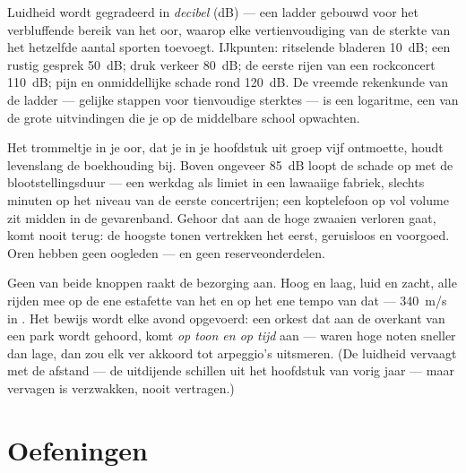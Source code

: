 \begin{example}[De decibelladder]\label{ex:g8:sound-pitch-loudness:decibels}
Luidheid wordt gegradeerd in \emph{decibel} (\unit{dB})
--- een ladder gebouwd voor het verbluffende bereik van het oor, waarop
elke vertienvoudiging van de sterkte van het  hetzelfde
aantal sporten toevoegt. IJkpunten: ritselende bladeren \qty{10}{dB};
een rustig gesprek \qty{50}{dB}; druk verkeer \qty{80}{dB}; de eerste
rijen van een rockconcert \qty{110}{dB}; pijn en onmiddellijke schade
rond \qty{120}{dB}. De vreemde rekenkunde van de ladder --- gelijke
stappen voor tienvoudige sterktes --- is een logaritme, een van de
grote uitvindingen die je op de middelbare school opwachten.
\end{example}

\begin{remark}\label{rem:g8:sound-pitch-loudness:earsafety}
Het trommeltje in je oor, dat je in je hoofdstuk uit groep vijf
ontmoette, houdt levenslang de boekhouding bij. Boven ongeveer
\qty{85}{dB} loopt de schade op met de blootstellingsduur --- een
werkdag als limiet in een lawaaiige fabriek, slechts minuten op het
niveau van de eerste concertrijen; een koptelefoon op vol volume zit
midden in de gevarenband. Gehoor dat aan de hoge zwaaien verloren
gaat, komt nooit terug: de hoogste tonen vertrekken het eerst, geruisloos
en voorgoed. Oren hebben geen oogleden --- en geen reserveonderdelen.
\end{remark}

\begin{example}\label{ex:g8:sound-pitch-loudness:speed}
Geen van beide knoppen raakt de bezorging aan. Hoog en laag, luid en
zacht, alle  rijden mee op de ene estafette van het
 en op het ene tempo van dat  ---
\qty{340}{m/s} in . Het bewijs wordt elke avond opgevoerd:
een orkest dat aan de overkant van een park wordt gehoord, komt
\emph{op toon en op tijd} aan --- waren hoge noten sneller dan lage, dan
zou elk ver akkoord tot arpeggio's uitsmeren. (De luidheid vervaagt met
de afstand --- de uitdijende schillen uit het hoofdstuk van vorig jaar
--- maar vervagen is verzwakken, nooit vertragen.)
\end{example}

\section{Oefeningen}


